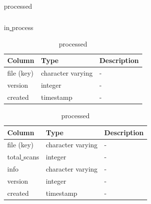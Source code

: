 \documentclass[12pt]{article}
\begin{document}
\begin{table}[!htb]
\begin{scriptsize}
\begin{subtable}{.9\linewidth}
\begin{tabular}{l l l}
        \end{tabular}
    \end{subtable}%
    \newline
    \newline

    \begin{subtable}{.9\linewidth}
     \captionsetup{font=scriptsize}
      \centering
       \caption{in\underline{ }process}
      \label{table:in_process}
        \begin{tabular}{l l l}
 \hline\hline
Column & Type & Description \\ [0.5ex]
\hline
file (key)                     & character varying                  & -\\
version                        & integer                     & -\\
created                        & timestamp                   & -\\[1ex]
\hline
           
        \end{tabular}
    \end{subtable}%
    \newline
    \newline

    \begin{subtable}{.9\linewidth}
     \captionsetup{font=scriptsize}
      \centering
        \caption{processed}
      \label{table:processed}
        \begin{tabular}{l l l}
          \hline\hline
Column & Type & Description \\ [0.5ex]
\hline
file (key)                     & character varying                  & -\\
total\underline{ }scans        & integer                     & -\\
info                           & character varying                   & -\\
version                        & integer                     & -\\
created                        & timestamp                   & -\\[1ex]
\hline
            
        \end{tabular}
    \end{subtable}%
    \newline
    \newline
\end{scriptsize}    
\end{table}
\end{document}
